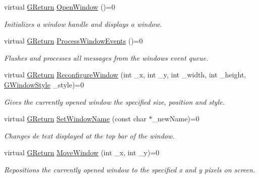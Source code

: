 \begin{DoxyCompactItemize}
\item 
virtual \mbox{\hyperlink{namespaceGW_a67a839e3df7ea8a5c5686613a7a3de21}{G\+Return}} \mbox{\hyperlink{classGW_1_1SYSTEM_1_1GWindow_a402b550212d77f19638ef1a1db9ad397}{Open\+Window}} ()=0
\begin{DoxyCompactList}\small\item\em Initializes a window handle and displays a window. \end{DoxyCompactList}\item 
virtual \mbox{\hyperlink{namespaceGW_a67a839e3df7ea8a5c5686613a7a3de21}{G\+Return}} \mbox{\hyperlink{classGW_1_1SYSTEM_1_1GWindow_a6c7db60db04436ac21cba3147f287e84}{Process\+Window\+Events}} ()=0
\begin{DoxyCompactList}\small\item\em Flushes and processes all messages from the window\textquotesingle{}s event queue. \end{DoxyCompactList}\item 
virtual \mbox{\hyperlink{namespaceGW_a67a839e3df7ea8a5c5686613a7a3de21}{G\+Return}} \mbox{\hyperlink{classGW_1_1SYSTEM_1_1GWindow_a113350a164370d30932a0476f00e4ea9}{Reconfigure\+Window}} (int \+\_\+x, int \+\_\+y, int \+\_\+width, int \+\_\+height, \mbox{\hyperlink{namespaceGW_1_1SYSTEM_ad117891e556631f842625c348d36a071}{G\+Window\+Style}} \+\_\+style)=0
\begin{DoxyCompactList}\small\item\em Gives the currently opened window the specified size, position and style. \end{DoxyCompactList}\item 
virtual \mbox{\hyperlink{namespaceGW_a67a839e3df7ea8a5c5686613a7a3de21}{G\+Return}} \mbox{\hyperlink{classGW_1_1SYSTEM_1_1GWindow_a7363e8eec8aebed1634d97706b4f391f}{Set\+Window\+Name}} (const char $\ast$\+\_\+new\+Name)=0
\begin{DoxyCompactList}\small\item\em Changes de text displayed at the top bar of the window. \end{DoxyCompactList}\item 
virtual \mbox{\hyperlink{namespaceGW_a67a839e3df7ea8a5c5686613a7a3de21}{G\+Return}} \mbox{\hyperlink{classGW_1_1SYSTEM_1_1GWindow_a9fc043b893f26c35e6ba965adcc17edb}{Move\+Window}} (int \+\_\+x, int \+\_\+y)=0
\begin{DoxyCompactList}\small\item\em Repositions the currently opened window to the specified x and y pixels on screen. \end{DoxyCompactList}\item 

\end{DoxyCompactItemize}
